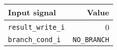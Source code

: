 {
\footnotesize
\begin{tabular}{|l|r|}
  \hline
  \cellcolor{gray!20}\textbf{Input signal} & \cellcolor{gray!20}\textbf{Value} \\
  \hline
  \texttt{result\_write\_i} & 0 \\
  \hline
  \texttt{branch\_cond\_i} & \texttt{NO\_BRANCH} \\
  \hline
\end{tabular}
}
